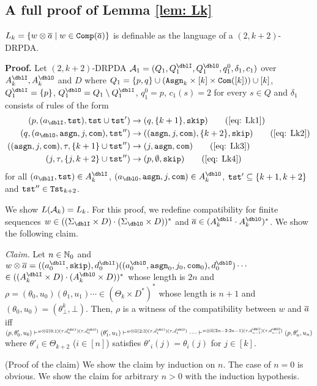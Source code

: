 \subsection{A full proof of Lemma \ref{lem: Lk}}
\setcounter{lemma}{\ref{lem: Lk}}
\addtocounter{lemma}{-1}
\begin{lemma}
$L_k = \{w\otimes{\overline{a}} \mid w\in{\mathtt{Comp}}({\overline{a}})\}$ is definable as the language of a $(2,k+2)$-DRPDA.
\end{lemma}
{\bf Proof.}\quad
Let $(2,k+2)$-DRPDA
$\calA_1=(Q_1, Q^\dblI_1, Q^\dblO_1, q^0_1, \delta_1, c_1)$
over $A_k^\dblI, A_k^\dblO$ and $D$ where
$Q_1=\{p, q\}\cup(\mathtt{Asgn}_k\times[k]\times\mathtt{Com}([k]))\cup[k]$, $Q^\dblI_1=\{p\}$, $Q^\dblO_1 = Q_1\setminus Q^\dblI_1$, $q^0_1 = p$,
$c_1(s)=2$ for every $s\in Q$ and $\delta_1$ consists of rules of the form
\begin{align}
(p, (a_\dblI, \tst), \tst\cup\tst')&\to(q, \{k+1\}, \skip)\tag{\ref{eq: Lk1}}\\
(q, (a_\dblO, \asgn, j, \com), \tst'')&\to((\asgn,j,\com), \{k+2\},\skip)\tag{\ref{eq: Lk2}}\\
((\asgn,j,\com), \tau, \{k+1\}\cup\tst'')&\to(j, \asgn, \com)\tag{\ref{eq: Lk3}}\\
(j, \tau, \{j, k+2\}\cup\tst'')&\to(p, \emptyset, \skip)\tag{\ref{eq: Lk4}}
\end{align}
for all $(a_\dblI, \tst)\in A_k^\dblI$, $(a_\dblO, \asgn, j, \com)\in A_k^\dblO$, $\mathtt{tst}'\subseteq \{k+1,k+2\}$ and $\mathtt{tst}''\in\mathtt{Tst}_{k+2}$.

We show $L({\cal A}_k) = L_k$.
For this proof, we redefine compatibility for finite sequences $w\in ((\Sigma_\dblI\times D)\cdot (\Sigma_\dblO\times D))^*$ and $\overa\in(A_k^\dblI\cdot A_k^\dblO)^*$.
We show the following claim.
\par\medskip\noindent
{\it Claim.} Let $n\in\mathbb{N}_0$ and $w\otimes\overa = ((a^\dblI_0,\skip), d^\dblI_0)((a^\dblO_0,\asgn_0,j_0, \com_0), d^\dblO_0)\cdots$ $\in ((A_k^\dblI\times D)\cdot(A_k^\dblO\times D))^*$
whose length is $2n$ and
$\rho = (\theta_0,u_0)(\theta_1, u_1)\cdots\in (\Theta_k\times D^*)^*$ whose length is $n+1$ and $(\theta_0, u_0)=(\theta^{k}_\bot, \bot)$.
Then,
$\rho$ is a witness of the compatibility between $w$ and ${\overline{a}}$ iff
$(p,\theta'_0,u_0)\vdash^{w\otimes\overa(0:1)(\tau,d^\dblI_{0})(\tau,d^\dblO_{0})}(\theta'_1,u_1)\vdash^{w\otimes\overa(2:3)(\tau,d^\dblI_{1})(\tau,d^\dblO_{1})}\cdots\vdash^{w\otimes\overa(2n-2:2n-1)(\tau,d^\dblI_{n-1})(\tau,d^\dblO_{n-1})}(p,\theta'_{n},u_{n})$
where $\theta'_i\in \Theta_{k+2}$ ($i\in[n]$) satisfies $\theta'_i(j)=\theta_i(j)$ for $j\in[k]$.
\par\medskip\noindent
(Proof of the claim)
We show the claim by induction on $n$.
The case of $n=0$ is obvious.
We show the claim for arbitrary $n>0$ with the induction hypothesis.

